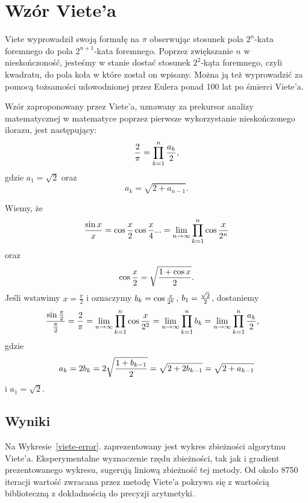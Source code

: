 \section{Wzór Viete'a}


Viete wyprowadził swoją formułę na $\pi$ obserwując stosunek pola $2^n$-kata foremnego do pola $2^{n+1}$-kata foremnego. Poprzez zwiększanie $n$ w nieskończoność, jesteśmy w stanie dostać stosunek $2^2$-kąta foremnego, czyli kwadratu, do pola koła w które został on wpisany. Można ją też wyprowadzić za pomocą tożsamości udowodnionej przez Eulera ponad 100 lat po śmierci Viete'a.

Wzór zaproponowany przez Viete'a, uznawany za prekursor analizy matematycznej w matematyce poprzez pierwsze wykorzystanie nieskończonego ilorazu, jest następujący:
\begin{equation}
    {2\over\pi}=\prod\limits_{k=1}^n{a_k\over2},
\end{equation}
gdzie $a_1=\sqrt2$ oraz
$$a_k=\sqrt{2+a_{n-1}}.$$

Wiemy, że
$${\sin x\over x}=\cos\frac x2\cos\frac x4...=\lim_{n\to\infty}\prod\limits_{k=1}^n\cos{x\over 2^n}$$
oraz
$$\cos\frac x2=\sqrt{{1+\cos x\over 2}}.$$
Jeśli wstawimy $x=\frac\pi2$ i oznaczymy $b_k=\cos{x\over 2^k}$, $b_1={\sqrt2\over2}$,  dostaniemy
\begin{align*}
    {\sin\frac\pi2\over\frac\pi2}&=\frac2\pi=\lim_{n\to\infty}\prod\limits_{k=1}^n\cos{x\over 2^2}=\lim_{n\to\infty}\prod\limits_{k=1}^nb_k=\lim_{n\to\infty}\prod\limits_{k=1}^n{a_k\over 2},
\end{align*}
gdzie 
$$a_k=2b_k=2\sqrt{{1+b_{k-1}\over 2}}=\sqrt{2+2b_{k-1}}=\sqrt{2+a_{k-1}}$$
i $a_1=\sqrt2$.

\subsection{Wyniki}

Na Wykresie~\ref{viete-error}. zaprezentowany jest wykres zbieżności algorytmu Viete'a. Eksperymentalne wyznaczenie rzędu zbieżności, tak jak i gradient prezentowanego wykresu, sugerują liniową zbieżność tej metody. Od około 8750 iteracji wartość zwracana przez metodę Viete'a pokrywa się z wartością biblioteczną z dokładnością do precyzji arytmetyki.

